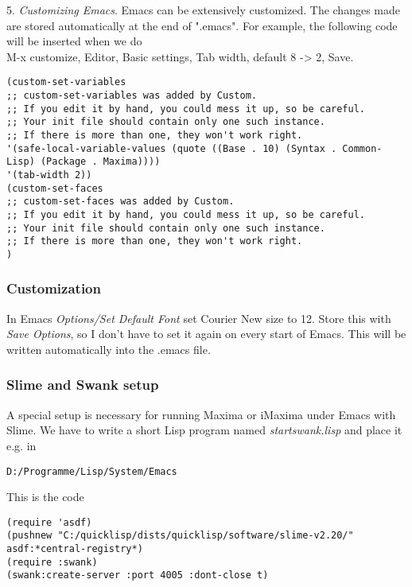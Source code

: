 \documentclass[../Maxima_Workbook.tex]{subfiles}
\begin{document}
5. \emph{Customizing Emacs}. Emacs can be extensively customized. The changes made are stored automatically at the end of ".emacs". For example, the following code will be inserted when we do \\
M-x customize, Editor, Basic settings, Tab width, default 8 -> 2, Save.

\begin{lstlisting}[style=lisp]
(custom-set-variables
;; custom-set-variables was added by Custom.
;; If you edit it by hand, you could mess it up, so be careful.
;; Your init file should contain only one such instance.
;; If there is more than one, they won't work right.
'(safe-local-variable-values (quote ((Base . 10) (Syntax . Common-Lisp) (Package . Maxima))))
'(tab-width 2))
(custom-set-faces
;; custom-set-faces was added by Custom.
;; If you edit it by hand, you could mess it up, so be careful.
;; Your init file should contain only one such instance.
;; If there is more than one, they won't work right.
)
\end{lstlisting}

\subsubsection{Customization}

In Emacs \emph{Options/Set Default Font} set Courier New size to 12. Store this with \emph{Save Options}, so I don't have to set it again on every start of Emacs. This will be written automatically into the .emacs file.

\subsubsection{Slime and Swank setup}

A special setup is necessary for running Maxima or iMaxima under Emacs with Slime. We have to write a short Lisp program named \emph{startswank.lisp} and place it e.g. in 

\begin{lstlisting}[style=lisp]
D:/Programme/Lisp/System/Emacs
\end{lstlisting}

This is the code

\begin{lstlisting}[style=lisp]
(require 'asdf)
(pushnew "C:/quicklisp/dists/quicklisp/software/slime-v2.20/" asdf:*central-registry*)
(require :swank)
(swank:create-server :port 4005 :dont-close t)
\end{lstlisting}
\end{document}
